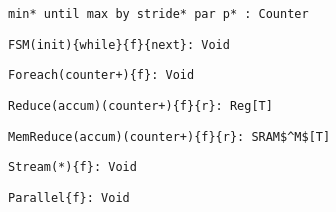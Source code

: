 
\begin{table*}
\centering

\newsavebox{\counter}
\begin{lrbox}{\counter}
\begin{lstlisting}[language=SpatialTable]
min* until max by stride* par p* : Counter
\end{lstlisting}
\end{lrbox}

\newsavebox{\fsmSignature}
\begin{lrbox}{\fsmSignature}
\begin{lstlisting}[language=SpatialTable]
FSM(init){while}{f}{next}: Void
\end{lstlisting}
\end{lrbox}

\newsavebox{\foreachSignature}
\begin{lrbox}{\foreachSignature}
\begin{lstlisting}[language=SpatialTable]
Foreach(counter+){f}: Void
\end{lstlisting}
\end{lrbox}

\newsavebox{\reduceSignature}
\begin{lrbox}{\reduceSignature}
\begin{lstlisting}[language=SpatialTable]
Reduce(accum)(counter+){f}{r}: Reg[T]
\end{lstlisting}
\end{lrbox}

\newsavebox{\memreduceSignature}
\begin{lrbox}{\memreduceSignature}
\begin{lstlisting}[language=SpatialTable]
MemReduce(accum)(counter+){f}{r}: SRAM$^M$[T]
\end{lstlisting}
\end{lrbox}

\newsavebox{\streamStar}
\begin{lrbox}{\streamStar}
\begin{lstlisting}[language=SpatialTable]
Stream(*){f}: Void
\end{lstlisting}
\end{lrbox}

\newsavebox{\parallelSignature}
\begin{lrbox}{\parallelSignature}
\begin{lstlisting}[language=SpatialTable]
Parallel{f}: Void
\end{lstlisting}
\end{lrbox}


\end{table*}
